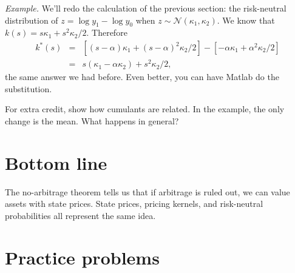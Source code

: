 \documentclass[11pt]{article}
\begin{document}
{\it Example.\/}
We'll redo the calculation of the previous section:
the risk-neutral distribution of $z = \log y_1 - \log y_0$
when $z \sim \mathcal{N}(\kappa_1,\kappa_2)$.
We know that $k(s) = s \kappa_1 + s^2 \kappa_2/2$.
Therefore
\begin{eqnarray*}
    k^*(s) &=& [(s-\alpha) \kappa_1 + (s-\alpha)^2 \kappa_2/2]
            - [-\alpha \kappa_1 + \alpha^2 \kappa_2/2]  \\
           &=& s(\kappa_1 - \alpha \kappa_2) + s^2 \kappa_2/2 ,
\end{eqnarray*}
the same answer we had before.
Even better, you can have Matlab do the substitution.

For extra credit, show how cumulants are related.
In the example, the only change is the mean.
What happens in general?


\section*{Bottom line}

The no-arbitrage theorem tells us that if arbitrage is ruled out,
we can value assets with state prices.
State prices, pricing kernels, and risk-neutral probabilities all represent
the same idea.


\section*{Practice problems}
\end{document}

